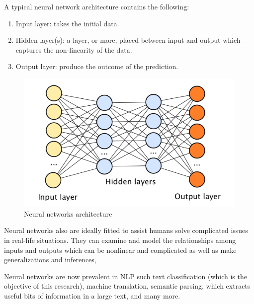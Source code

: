 \documentclass[12pt]{diazessay}
\begin{document}
        A typical neural network architecture contains the following:
        \begin{enumerate}
            \item Input layer: takes the initial data.
            \item Hidden layer(s): a layer, or more, placed between input and output which captures the non-linearity of the data.
            \item Output layer: produce the outcome of the prediction.
        \end{enumerate}
        
        \begin{figure}[h]
            \centering
            \includegraphics[scale=0.5]{Figures/neural networks.png}
            \caption{Neural networks architecture \cite{marcus2018deep}}
            \label{fig:cmp}
        \end{figure}
        
        Neural networks also are ideally fitted to assist humans solve complicated issues in real-life situations. They can examine and model the relationships among inputs and outputs which can be nonlinear and complicated as well as make generalizations and inferences,
        
        
        Neural networks are now prevalent in NLP such text classification (which is the objective of this research), machine translation, semantic parsing, which extracts useful bits of information in a large text, and many more.
        
\end{document}
